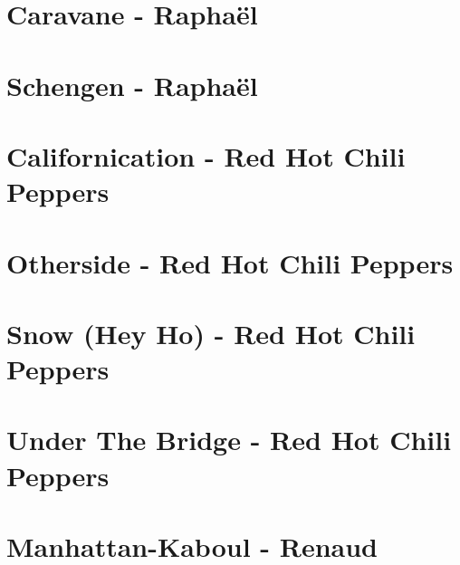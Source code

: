 \documentclass{guitartabs}
\begin{document}
\section{Caravane - Raphaël}
\begin{guitar}

\end{guitar}

\section{Schengen - Raphaël}
\begin{guitar}

\end{guitar}

\section*{Californication - Red Hot Chili Peppers}
\begin{guitar}

\end{guitar}

\section*{Otherside - Red Hot Chili Peppers}
\begin{guitar}

\end{guitar}

\section{Snow  (Hey Ho) - Red Hot Chili Peppers}
\begin{guitar}

\end{guitar}

\section*{Under The Bridge - Red Hot Chili Peppers}
\begin{guitar}

\end{guitar}



\section{Manhattan-Kaboul - Renaud}
\begin{guitar}

\end{guitar}
\end{document}
